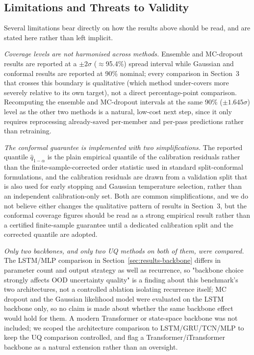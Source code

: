 \documentclass[a4paper,fleqn]{cas-sc}
\begin{document}
\subsection{Limitations and Threats to Validity}
\label{sec:limitations}

Several limitations bear directly on how the results above should be read, and are stated here rather than left implicit.

\emph{Coverage levels are not harmonised across methods.} Ensemble and MC-dropout results are reported at a $\pm2\sigma$ ($\approx$95.4\%) spread interval while Gaussian and conformal results are reported at 90\% nominal; every comparison in Section~3 that crosses this boundary is qualitative (which method under-covers more severely relative to its own target), not a direct percentage-point comparison. Recomputing the ensemble and MC-dropout intervals at the same 90\% ($\pm1.645\sigma$) level as the other two methods is a natural, low-cost next step, since it only requires reprocessing already-saved per-member and per-pass predictions rather than retraining.

\emph{The conformal guarantee is implemented with two simplifications.} The reported quantile $\hat q_{1-\alpha}$ is the plain empirical quantile of the calibration residuals rather than the finite-sample-corrected order statistic used in standard split-conformal formulations, and the calibration residuals are drawn from a validation split that is also used for early stopping and Gaussian temperature selection, rather than an independent calibration-only set. Both are common simplifications, and we do not believe either changes the qualitative pattern of results in Section~3, but the conformal coverage figures should be read as a strong empirical result rather than a certified finite-sample guarantee until a dedicated calibration split and the corrected quantile are adopted.

\emph{Only two backbones, and only two UQ methods on both of them, were compared.} The LSTM/MLP comparison in Section~\ref{sec:results-backbone} differs in parameter count and output strategy as well as recurrence, so "backbone choice strongly affects OOD uncertainty quality" is a finding about this benchmark's two architectures, not a controlled ablation isolating recurrence itself; MC dropout and the Gaussian likelihood model were evaluated on the LSTM backbone only, so no claim is made about whether the same backbone effect would hold for them. A modern Transformer or state-space backbone was not included; we scoped the architecture comparison to LSTM/GRU/TCN/MLP to keep the UQ comparison controlled, and flag a Transformer/iTransformer backbone as a natural extension rather than an oversight.
\end{document}
